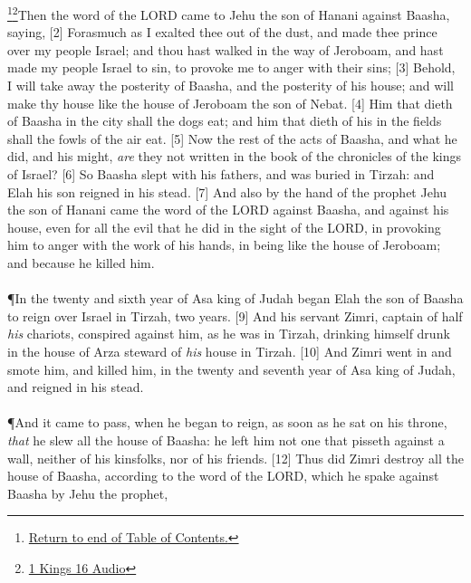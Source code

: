 \footnote{\textcolor[cmyk]{0.99998,1,0,0}{\hyperlink{TOC}{Return to end of Table of Contents.}}}\footnote{\href{https://audiobible.com/bible/1_kings_16.html}{\textcolor[cmyk]{0.99998,1,0,0}{1 Kings 16 Audio}}}\textcolor[cmyk]{0.99998,1,0,0}{Then the word of the LORD came to Jehu the son of Hanani against Baasha, saying,}
[2] \textcolor[cmyk]{0.99998,1,0,0}{Forasmuch as I exalted thee out of the dust, and made thee prince over my people Israel; and thou hast walked in the way of Jeroboam, and hast made my people Israel to sin, to provoke me to anger with their sins;}
[3] \textcolor[cmyk]{0.99998,1,0,0}{Behold, I will take away the posterity of Baasha, and the posterity of his house; and will make thy house like the house of Jeroboam the son of Nebat.}
[4] \textcolor[cmyk]{0.99998,1,0,0}{Him that dieth of Baasha in the city shall the dogs eat; and him that dieth of his in the fields shall the fowls of the air eat.}
[5] \textcolor[cmyk]{0.99998,1,0,0}{Now the rest of the acts of Baasha, and what he did, and his might, \emph{are} they not written in the book of the chronicles of the kings of Israel?}
[6] \textcolor[cmyk]{0.99998,1,0,0}{So Baasha slept with his fathers, and was buried in Tirzah: and Elah his son reigned in his stead.}
[7] \textcolor[cmyk]{0.99998,1,0,0}{And also by the hand of the prophet Jehu the son of Hanani came the word of the LORD against Baasha, and against his house, even for all the evil that he did in the sight of the LORD, in provoking him to anger with the work of his hands, in being like the house of Jeroboam; and because he killed him.}\\
\\
\P \textcolor[cmyk]{0.99998,1,0,0}{In the twenty and sixth year of Asa king of Judah began Elah the son of Baasha to reign over Israel in Tirzah, two years.}
[9] \textcolor[cmyk]{0.99998,1,0,0}{And his servant Zimri, captain of half \emph{his} chariots, conspired against him, as he was in Tirzah, drinking himself drunk in the house of Arza steward of \emph{his} house in Tirzah.}
[10] \textcolor[cmyk]{0.99998,1,0,0}{And Zimri went in and smote him, and killed him, in the twenty and seventh year of Asa king of Judah, and reigned in his stead.}\\
\\
\P \textcolor[cmyk]{0.99998,1,0,0}{And it came to pass, when he began to reign, as soon as he sat on his throne, \emph{that} he slew all the house of Baasha: he left him not one that pisseth against a wall, neither of his kinsfolks, nor of his friends.}
[12] \textcolor[cmyk]{0.99998,1,0,0}{Thus did Zimri destroy all the house of Baasha, according to the word of the LORD, which he spake against Baasha by Jehu the prophet,}
